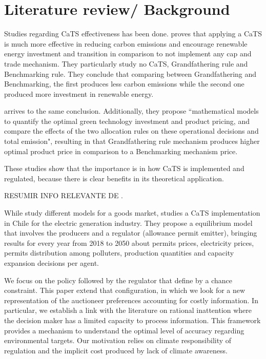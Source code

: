 \documentclass[a4paper,fleqn]{cas-dc}
\begin{document}
\section{Literature review/ Background}\label{sec:review}

Studies regarding CaTS effectiveness has been done. \cite{chen_renewable_2021} proves that applying a CaTS is much more effective in reducing carbon emissions and encourage renewable energy investment and transition in 
comparison to not implement any cap and trade mechanism. They particularly study no CaTS, Grandfathering 
rule and Benchmarking rule. They conclude that comparing between Grandfathering and Benchmarking, the first produces less carbon emissions while the second one produced more investment in renewable energy.

\cite{yang_effects_2020} arrives to the same conclusion. Additionally, they propose ``mathematical models to quantify the optimal green technology investment and product pricing, and compare the
effects of the two allocation rules on these operational decisions and total emission", resulting in that Grandfathering rule mechanism produces higher optimal product price in comparison to a Benchmarking mechanism price. 

These studies show that the importance is in how CaTS is implemented and regulated, because there is clear benefits in its theoretical application. 


RESUMIR INFO RELEVANTE DE \cite{foramitti_emission_2021,pasten_rational_2016,chen_competition_2022}.


While \cite{foramitti_emission_2021} study different models for a goods market, \cite{amigo_two_2021} studies a CaTS implementation in Chile for the electric generation industry. They propose a equilibrium model that involves the producers and a regulator (allowance permit emitter), bringing results for every year from 2018 to 2050 about permits prices, electricity prices, permits distribution among polluters, production quantities and capacity expansion decisions per agent. 

We focus on the policy followed by the regulator that \cite{amigo_two_2021} define by a chance constraint. This paper extend that configuration, in which we look for a new representation of the auctioneer preferences accounting for costly information. In particular, we establish a link with the literature on rational inattention where the decision maker has a limited capacity to process information. This framework provides a mechanism to understand the optimal level of accuracy regarding environmental targets. Our motivation relies on climate responsibility of regulation and the implicit cost produced by lack of climate awareness.
\end{document}
